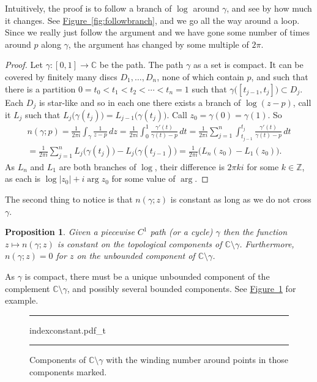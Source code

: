 \documentclass[12pt,openany]{book}
\newcommand{\sabs}[1]{\lvert {#1} \rvert}
\newcommand{\C}{{\mathbb{C}}}
\newcommand{\Z}{{\mathbb{Z}}}
\theoremstyle{plain}
\newtheorem{prop}[thm]{Proposition}
\theoremstyle{remark}
\theoremstyle{definition}
\newenvironment{myfig}{%
\begin{figure}[h!t]
\noindent\rule{\textwidth}{0.4pt}\vspace{12pt}\par\centering}%
{\par\noindent\rule{\textwidth}{0.4pt}
\end{figure}}
\theoremstyle{exercise}
\theoremstyle{example}
\newcommand{\figureref}[1]{\hyperref[#1]{Figure~\ref*{#1}}}
\begin{document}
Intuitively, the proof is to follow a branch of $\log$ around $\gamma$, and
see by how much it changes.  See \figureref{fig:followbranch}, and we
go all the way around a loop.  Since we really just follow the argument
and we have gone some number of times around $p$ along $\gamma$, the
argument has changed by some multiple of $2\pi$.

\begin{proof}
Let $\gamma \colon [0,1] \to \C$ be the path.
The path $\gamma$ as a set is compact.  It can be covered by finitely many
discs $D_1,\ldots,D_n$, none of which contain $p$, and such that there is a
partition $0 = t_0 < t_1 < t_2 < \cdots < t_n = 1$ such that
$\gamma\bigl([t_{j-1},t_j]\bigr) \subset D_j$.  Each $D_j$ is star-like and
so in each one there exists a branch of $\log (z-p)$, call it $L_j$
such that $L_j\bigl(\gamma(t_j)\bigr) = L_{j-1}\bigl(\gamma(t_j)\bigr)$.
Call $z_0 = \gamma(0) = \gamma(1)$.  So
\begin{multline*}
n(\gamma;p)
=
\frac{1}{2\pi i} \int_\gamma \frac{1}{z-p} \, dz
=
\frac{1}{2\pi i} \int_0^1 \frac{\gamma'(t)}{\gamma(t)-p} \, dt
=
\frac{1}{2\pi i} \sum_{j=1}^n \int_{t_{j-1}}^{t_j} \frac{\gamma'(t)}{\gamma(t)-p} \, dt
\\
=
\frac{1}{2\pi i} \sum_{j=1}^n L_j\bigl(\gamma(t_j)\bigr) -
L_j\bigl(\gamma(t_{j-1})\bigr)
=
\frac{1}{2\pi i} \bigl( L_n(z_0) - L_1(z_0) \Bigr) .
\end{multline*}
As $L_n$ and $L_1$ are both branches of $\log$, their difference is
$2\pi k i$ for some $k \in \Z$, as each is $\log\sabs{z_0} + i \arg z_0$ for some value of
$\arg$.
\end{proof}

The second thing to notice is that $n(\gamma;z)$ is constant as long as we
do not cross $\gamma$.

\begin{prop}
Given a piecewise $C^1$ path (or a cycle) $\gamma$ then
the function $z \mapsto n(\gamma;z)$ is constant on the
topological components of $\C \setminus \gamma$.
Furthermore, $n(\gamma;z) = 0$ for $z$ on the unbounded component
of $\C \setminus \gamma$.
\end{prop}

As $\gamma$ is compact, there must be a unique unbounded component
of the complement $\C \setminus \gamma$, and possibly several bounded
components.
See \figureref{fig:indexconstant} for example.

\begin{myfig}
{indexconstant.pdf_t}
\caption{Components of $\C \setminus \gamma$ with the 
winding number around points in those components
marked.\label{fig:indexconstant}}
\end{myfig}
\end{document}
